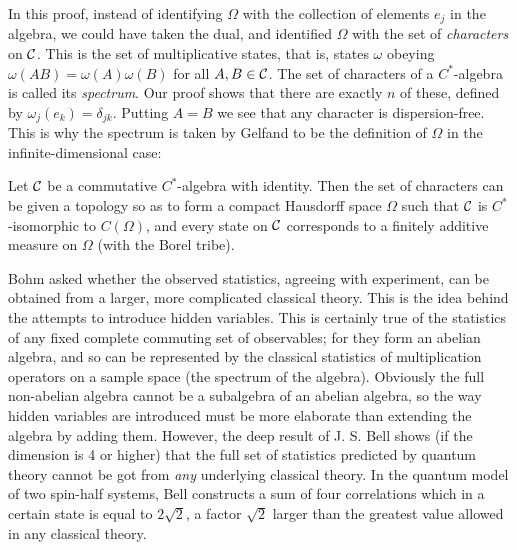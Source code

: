 In this proof, instead of identifying $\Omega$ with the collection of
elements $e_j$ in the algebra, we could have taken the dual, and
identified $\Omega$
with the set of {\em characters} on ${\cal C}$. This is the set of
multiplicative states, that is, states $\omega$ obeying $\omega(AB)
=\omega(A)\omega(B)$ for all $A,B\in{\cal C}$. The set of
characters of a $C^*$-algebra is called
its {\em spectrum}. Our proof shows that there are exactly $n$ of these, 
defined by $\omega_j(e_k)=\delta_{jk}$. Putting $A=B$ we see that any
character is dispersion-free. This is why the spectrum is taken by Gelfand
to be the definition of $\Omega$ in the infinite-dimensional case:
\begin{theorem}
Let ${\cal C}$ be a commutative $C^*$-algebra with identity. Then the set of
characters can be given a topology so as to form
a compact Hausdorff space $\Omega$ such that ${\cal C}$ is
$C^*$-isomorphic to $C(\Omega)$, and every state on ${\cal C}$ corresponds
to a finitely additive measure on $\Omega$ (with the Borel tribe).
\end{theorem}
 
Bohm asked whether the observed statistics, agreeing with
experiment, can be obtained from a larger, more complicated classical
theory. This is the idea behind the attempts to introduce hidden
variables. This is certainly true of the statistics of any fixed complete
commuting set of observables; for they form an abelian algebra, and so can
be represented by the classical statistics of multiplication operators
on a sample space (the spectrum of the algebra). Obviously
the full non-abelian algebra cannot be a subalgebra of an abelian algebra,
so the way hidden variables are introduced must be more elaborate
than extending the algebra by adding them. However, the deep
result of J. S. Bell shows (if the dimension is 4 or higher) that the
full set of statistics predicted by quantum theory cannot be got
from {\em any} underlying classical theory. In the quantum model
of two spin-half systems, Bell constructs a sum of four correlations
which in a certain state is equal to $2\surd 2$, a factor $\surd 2$
larger than the greatest value allowed in any classical theory.

